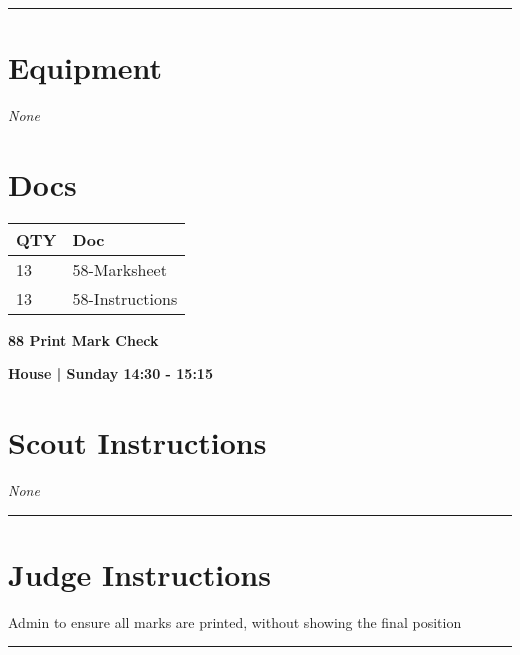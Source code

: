 \documentclass[10pt]{article}
\newcommand{\newtitle}[1]{\begin{center}{\Huge\bfseries #1 }\\ \vspace{5mm}\end{center}}
\newcommand{\newsubtitle}[1]{\begin{center}{\color{grey}\Large\bfseries #1 }\\ \vspace{5mm}\end{center}}
\begin{document}
			\vspace{0.5cm}
	\hrule
	\vspace{0.5cm}

	\begin{multicols}{2}

		\section*{\faWrench \: Equipment}

				\textit{None}
		
		\vfill\null
		\columnbreak

			\section*{\faFile \: Docs}
		 	\begin{center}
			\begin{tabular}{p{2cm}p{4cm}}

			\textbf{QTY} & \textbf{Doc} \\\toprule
										13&58-Marksheet\\\midrule
										13&58-Instructions\\\midrule
							\end{tabular}
			\end{center}
	

		\vfill\null

		\end{multicols}



	\vspace{1cm}


	\clearpage
		\newtitle{88 Print Mark Check }
	\newsubtitle{House | Sunday 14:30 - 15:15}
		\setcounter{section}{87}
	\section*{Scout Instructions}
		\textit{None}
	
	\vspace{0.5cm}
	\hrule
	\vspace{0.5cm}

		\section*{Judge Instructions}
		Admin to ensure all marks are printed, without showing the final position
\vspace{0.5cm}
	\hrule
	\vspace{0.5cm}
\end{document}
